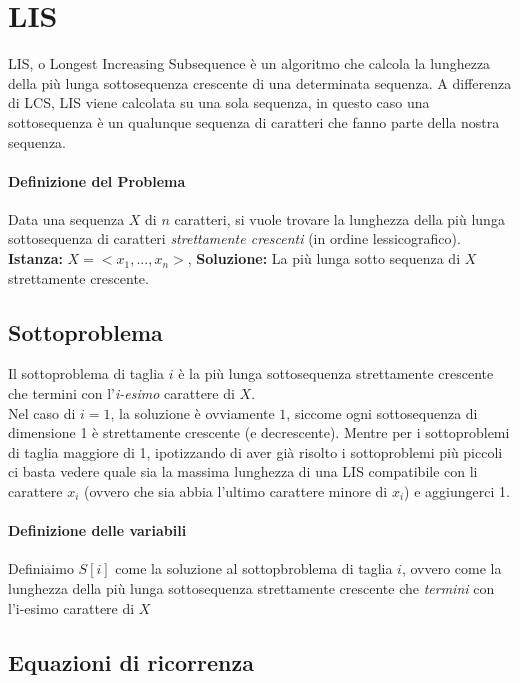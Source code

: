 \documentclass[12pt, a4paper, openany]{book}
\begin{document}
\section{LIS}
LIS, o Longest Increasing Subsequence è un algoritmo che calcola la lunghezza della più lunga sottosequenza crescente di una determinata sequenza.
A differenza di LCS, LIS viene calcolata su una sola sequenza, in questo caso una sottosequenza è un qualunque sequenza di caratteri che fanno parte della nostra sequenza.

\paragraph*{Definizione del Problema}
Data una sequenza $X$ di $n$ caratteri, si vuole trovare la lunghezza della più lunga sottosequenza di caratteri \emph{strettamente crescenti} (in ordine lessicografico).
\\\textbf{Istanza:} $X=<x_1,...,x_n>$, \textbf{Soluzione:} La più lunga sotto sequenza di $X$ strettamente crescente.


\subsection*{Sottoproblema} Il sottoproblema di taglia $i$ è la più lunga sottosequenza strettamente crescente che termini con l'\emph{i-esimo} carattere di $X$.
\\Nel caso di $i=1$, la soluzione è ovviamente $1$, siccome ogni sottosequenza di dimensione 1 è strettamente crescente (e decrescente).
Mentre per i sottoproblemi di taglia maggiore di 1, ipotizzando di aver già risolto i sottoproblemi più piccoli ci basta vedere quale sia la massima lunghezza di una LIS compatibile con li carattere $x_i$ (ovvero che sia abbia l'ultimo carattere minore di $x_i$)
e aggiungerci 1.

\paragraph{Definizione delle variabili}
Definiaimo $S[i]$ come la soluzione al sottopbroblema di taglia $i$, ovvero come la lunghezza della 
più lunga sottosequenza strettamente crescente che \emph{termini} con l'i-esimo carattere di $X$

\subsection*{Equazioni di ricorrenza}
\end{document}
